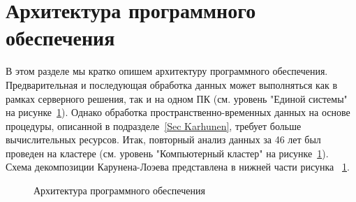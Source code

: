\section{Архитектура программного обеспечения}

В этом разделе мы кратко опишем архитектуру программного обеспечения. Предварительная и последующая обработка данных может выполняться как в рамках серверного решения, так и на одном ПК (см. уровень "Единой системы" на рисунке~\ref{algorithm_pic}). Однако обработка пространственно-временных данных на основе процедуры, описанной в подразделе~\ref{Sec Karhunen}, требует больше вычислительных ресурсов. Итак, повторный анализ данных за 46 лет был проведен на кластере (см. уровень "Компьютерный кластер" на рисунке~\ref{algorithm_pic}). Схема декомпозиции Карунена-Лоэева представлена в нижней части рисунка ~\ref{algorithm_pic}. 


\begin{figure}
	\caption{Архитектура программного обеспечения}
	\label{algorithm_pic}
\end{figure}


